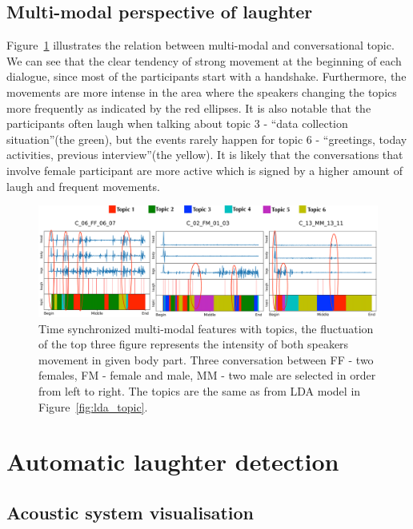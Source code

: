 \documentclass[10pt,journal,compsoc]{IEEEtran}
\begin{document}
\subsection{Multi-modal perspective of laughter}
Figure~\ref{fig:multimodal} illustrates the relation between multi-modal and conversational topic. We can see that the clear tendency of strong movement at the beginning of each dialogue, since most of the participants start with a handshake. Furthermore, the movements are more intense in the area where the speakers changing the topics more frequently as indicated by the red ellipses. It is also notable that the participants often laugh when talking about topic 3 - ``data collection situation''(the green), but the events rarely happen for topic 6 - ``greetings, today activities, previous interview''(the yellow). It is likely that the conversations that involve female participant are more active which is signed by a higher amount of laugh and frequent movements.
\begin{figure}[t]
  \centering
  \includegraphics[width=\linewidth]{figures/multimodal.pdf}
  \caption{Time synchronized multi-modal features with topics, the fluctuation of the top three figure represents the intensity of both speakers movement in given body part. Three conversation between FF - two females, FM - female and male, MM - two male are selected in order from left to right. The topics are the same as from LDA model in Figure~\ref{fig:lda_topic}.}
  \label{fig:multimodal}
\end{figure}

\section{Automatic laughter detection}
\label{sec:automatic-laughter-detection}


\subsection{Acoustic system visualisation}
\label{sec:acoustic-visualisation}
\end{document}
